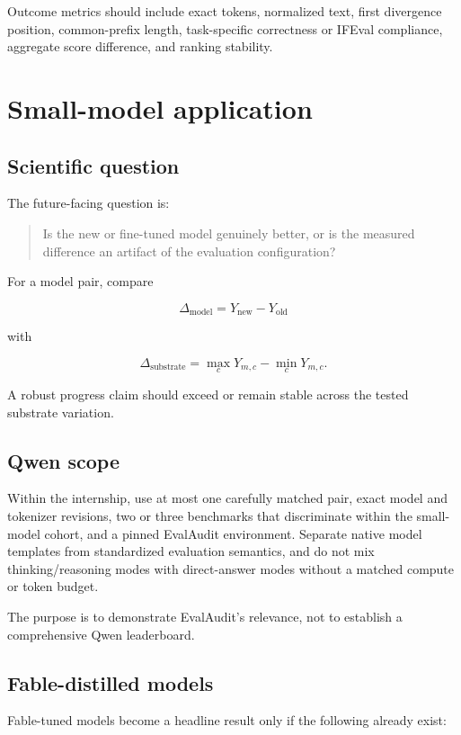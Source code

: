 \documentclass[11pt]{article}
\begin{document}
Outcome metrics should include exact tokens, normalized text, first divergence position, common-prefix length, task-specific correctness or IFEval compliance, aggregate score difference, and ranking stability.

\section{Small-model application}

\subsection{Scientific question}

The future-facing question is:

\begin{quote}
Is the new or fine-tuned model genuinely better, or is the measured difference an artifact of the evaluation configuration?
\end{quote}

For a model pair, compare

\[
\Delta_{\mathrm{model}} = Y_{\mathrm{new}} - Y_{\mathrm{old}}
\]

with

\[
\Delta_{\mathrm{substrate}} = \max_c Y_{m,c} - \min_c Y_{m,c}.
\]

A robust progress claim should exceed or remain stable across the tested substrate variation.

\subsection{Qwen scope}

Within the internship, use at most one carefully matched pair, exact model and tokenizer revisions, two or three benchmarks that discriminate within the small-model cohort, and a pinned EvalAudit environment. Separate native model templates from standardized evaluation semantics, and do not mix thinking/reasoning modes with direct-answer modes without a matched compute or token budget.

The purpose is to demonstrate EvalAudit's relevance, not to establish a comprehensive Qwen leaderboard.

\subsection{Fable-distilled models}

Fable-tuned models become a headline result only if the following already exist:
\end{document}
